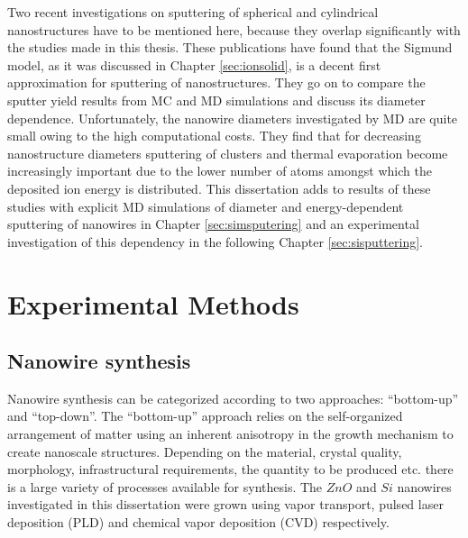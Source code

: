 Two recent investigations on sputtering of spherical \cite{nietiadi_sputtering_2014} and cylindrical \cite{urbassek_sputter_2015} nanostructures have to be mentioned here, because they overlap significantly with the studies made in this thesis. These publications have found that the Sigmund model, as it was discussed in Chapter \ref{sec:ionsolid}, is a decent first approximation for sputtering of nanostructures. They go on to compare the sputter yield results from MC and MD simulations and discuss its diameter dependence. Unfortunately, the nanowire diameters investigated by MD are quite small owing to the high computational costs. They find that for decreasing nanostructure diameters sputtering of clusters and thermal evaporation become increasingly important due to the lower number of atoms amongst which the deposited ion energy is distributed. This dissertation adds to results of these studies with explicit MD simulations of diameter and energy-dependent sputtering of nanowires in Chapter \ref{sec:simsputering} and an experimental investigation of this dependency in the following Chapter \ref{sec:sisputtering}.


\chapter{Experimental Methods}
\label{sec:experimental}

\section{Nanowire synthesis}

Nanowire synthesis can be categorized according to two approaches: ``bottom-up'' and ``top-down''. The ``bottom-up'' approach relies on the self-organized arrangement of matter using an inherent anisotropy in the growth mechanism to create nanoscale structures. Depending on the material, crystal quality, morphology, infrastructural requirements, the quantity to be produced etc. there is a large variety of processes available for synthesis. The $ZnO$ \cite{borchers_catalyst_2006, stichtenoth_dimensionseffekte_2008, muller_structural_2009,cao_tuning_2010,ogrisek_kontrolliertes_2013} and $Si$ \cite{lugstein_pressure-induced_2008} nanowires investigated in this dissertation were grown using vapor transport, pulsed laser deposition (PLD) and chemical vapor deposition (CVD) respectively. 


